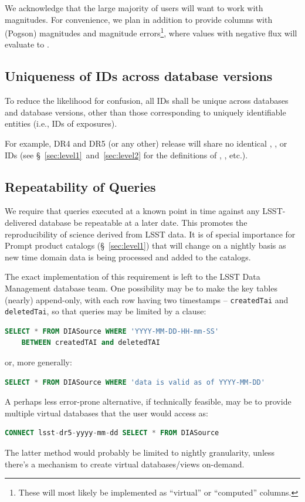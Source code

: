We acknowledge that the large majority of users will want to work with magnitudes. For convenience, we plan
in addition
to provide columns with (Pogson) magnitudes and magnitude errors\footnote{These will most likely be implemented as ``virtual'' or ``computed'' columns.}, where values with negative flux will evaluate to .

\subsection{Uniqueness of IDs across database versions}

To reduce the likelihood for confusion, all IDs shall be unique across databases and database versions, other than those corresponding to uniquely identifiable entities (i.e., IDs of exposures).

For example, DR4 and DR5 (or any other) release will share no identical \Object, \Source, \DIAObject or \DIASource IDs (see \S~\ref{sec:level1}~and~\ref{sec:level2} for the definitions of \Objects, \DIAObjects, etc.).

\subsection{Repeatability of Queries}
\label{sec:repeatability}

We require that queries executed at a known point in time against any LSST-delivered database be repeatable at a later date. This promotes the reproducibility of science derived from LSST data. It is of special importance for Prompt product catalogs (\S~\ref{sec:level1}) that will change on a nightly basis as new time domain data is being processed and added to the catalogs.

The exact implementation of this requirement is left to the LSST Data Management database team. One possibility may be to make the key tables (nearly) append-only, with each row having two timestamps -- \texttt{createdTai} and \texttt{deletedTai}, so that queries may be limited by a  clause:
\begin{lstlisting}[language=SQL,basicstyle=\ttfamily]
SELECT * FROM DIASource WHERE 'YYYY-MM-DD-HH-mm-SS'
    BETWEEN createdTAI and deletedTAI
\end{lstlisting}
%
or, more generally:
%
\begin{lstlisting}[language=SQL,basicstyle=\ttfamily,showstringspaces=false]
SELECT * FROM DIASource WHERE 'data is valid as of YYYY-MM-DD'
\end{lstlisting}
%
A perhaps less error-prone alternative, if technically feasible, may be to provide multiple virtual databases that the user would access as:
%
\begin{lstlisting}[language=SQL,basicstyle=\ttfamily]
CONNECT lsst-dr5-yyyy-mm-dd SELECT * FROM DIASource
\end{lstlisting}
%
The latter method would probably be limited to nightly granularity, unless there's a mechanism to create virtual databases/views on-demand.


